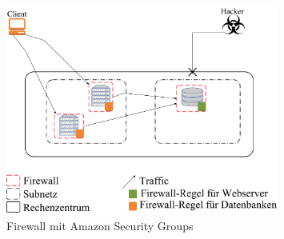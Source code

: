 \documentclass[titlepage]{report}
\begin{document}
\begin{figure}[h]
      \centering
      \includegraphics[width=0.8\textwidth]{figures/aws_firewall.pdf}
      \caption{Firewall mit Amazon Security Groups}\label{fig:7}
\end{figure}
\end{document}
